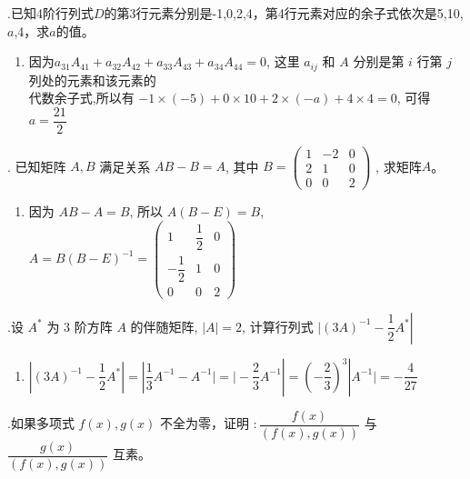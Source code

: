 \documentclass{article}
\begin{document}
\setlength{\parindent}{2em}                       %
{.}已知4阶行列式${D}$的第3行元素分别是-1,0,2,4，第4行元素对应的余子式依次是5,10,$a$,4，求$a$的值。
\begin{enumerate}[\qquad 解：]
    \item 因为$a_{31}A_{41}+a_{32}A_{42}+a_{33}A_{43}+a_{34}A_{44}=0$,
          这里 $a_{i j}$ 和 $A$ 分别是第 ${i}$ 行第 $j$ 列处的元素和该元素的  \\
          代数余子式,所以有 $-1 \times(-5)+0 \times 10+2 \times(-a)+4 \times 4=0$,
          可得 $a=\dfrac{21}{2}$
\end{enumerate}

\vspace{1ex}
{.} 已知矩阵 $A, B$ 满足关系 $A B-B=A$, 其中 $B=\left(
    \begin{array}{ccc}
            1 & -2 & 0 \\
            2 & 1  & 0 \\
            0 & 0  & 2
        \end{array}
    \right)$
, 求矩阵$A$。
\begin{enumerate}[\qquad 解：]
    \item 因为 ${A B-A=B}$, 所以 $A(B-E)=B$, $A=B(B-E)^{-1}=\left(
              \begin{array}{ccc}
                      1             & \dfrac{1}{2} & 0 \\
                      -\dfrac{1}{2} & 1            & 0 \\
                      0             & 0            & 2
                  \end{array}
              \right)$
\end{enumerate}

\vspace{1ex}
{.}设 $A^{*}$ 为 $3$ 阶方阵 $A$ 的伴随矩阵, $|A|=2$, 计算行列式 $|(3 A)^{-1}-\left.\dfrac{1}{2} A^{*}\right|$
\begin{enumerate}[\qquad 解：]
    \item $|(3 A)^{-1}-\left.\dfrac{1}{2} A^{*}\right|=|\dfrac{1}{3}A^{-1}-A^{-1}|=|-\dfrac{2}{3}A^{-1}|=(-\dfrac{2}{3})^{3}|A^{-1}|=-\dfrac{4}{27}$
\end{enumerate}

\vspace{1ex}
{.}如果多项式 $f(x), g(x)$ 不全为零，证明 $: \dfrac{f(x)}{(f(x), g(x))}$ 与 $\dfrac{g(x)}{(f(x), g(x))}$ 互素。
\end{document}
